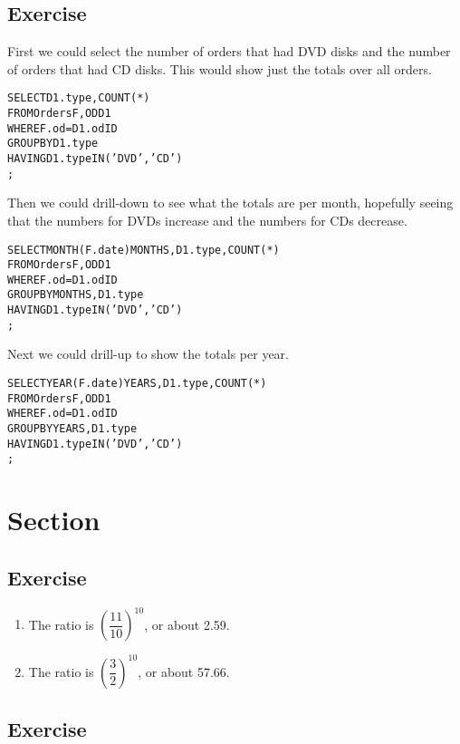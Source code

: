 \setcounter{subsection}{2}
\subsection*{Exercise \thesubsection}
First we could select the number of orders that had DVD disks and the
number of orders that had CD disks. This would show just the totals over
all orders.
\begin{alltt}
SELECT   D1.type, COUNT(*)
FROM     Orders F, OD D1
WHERE    F.od = D1.odID
GROUP BY D1.type
HAVING   D1.type IN('DVD','CD')
;
\end{alltt}
Then we could drill-down to see what the totals are per month, hopefully
seeing that the numbers for DVDs increase and the numbers for CDs decrease.
\begin{alltt}
SELECT   MONTH(F.date) MONTHS, D1.type, COUNT(*)
FROM     Orders F, OD D1
WHERE    F.od = D1.odID
GROUP BY MONTHS, D1.type
HAVING   D1.type IN('DVD','CD')
;
\end{alltt}
Next we could drill-up to show the totals per year.
\begin{alltt}
SELECT   YEAR(F.date) YEARS, D1.type, COUNT(*)
FROM     Orders F, OD D1
WHERE    F.od = D1.odID
GROUP BY YEARS, D1.type
HAVING   D1.type IN('DVD','CD')
;
\end{alltt}


\setcounter{section}{7}
\section*{Section \thesection}


\setcounter{subsection}{1}
\subsection*{Exercise \thesubsection}

\begin{enumerate}
\item
The ratio is $\left(\dfrac{11}{10}\right)^{10}$, or about 2.59.
\item
The ratio is $\left(\dfrac{3}{2}\right)^{10}$, or about 57.66.
\end{enumerate}

\setcounter{subsection}{2}
\subsection*{Exercise \thesubsection}

